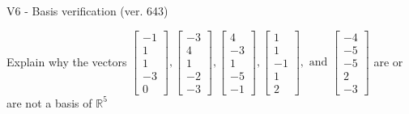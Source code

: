 \begin{exercise}
  \begin{exerciseTitle}V6 - Basis verification (ver. 643)\end{exerciseTitle}
  \begin{exerciseStatement}
    Explain why the vectors \(\left[\begin{array}{r}
-1 \\
1 \\
1 \\
-3 \\
0
\end{array}\right] , \left[\begin{array}{r}
-3 \\
4 \\
1 \\
-2 \\
-3
\end{array}\right] , \left[\begin{array}{r}
4 \\
-3 \\
1 \\
-5 \\
-1
\end{array}\right] , \left[\begin{array}{r}
1 \\
1 \\
-1 \\
1 \\
2
\end{array}\right] , \text{ and } \left[\begin{array}{r}
-4 \\
-5 \\
-5 \\
2 \\
-3
\end{array}\right]\) are or are not a basis of \(\mathbb{R}^5\)	



\end{exerciseStatement}
\end{exercise}
